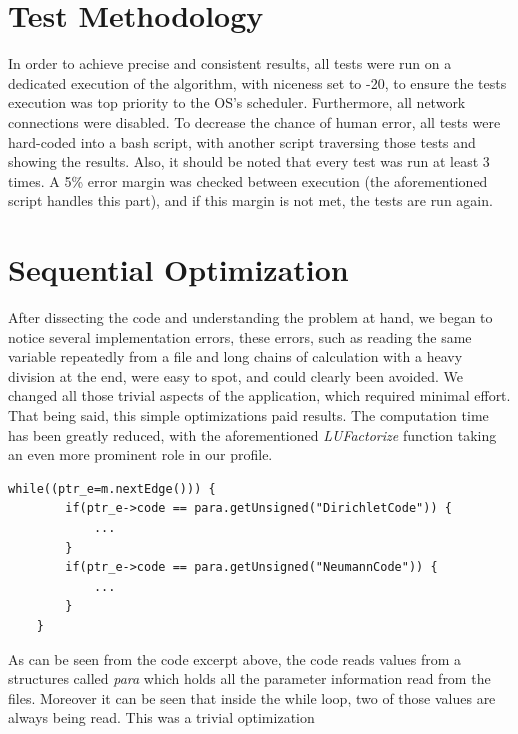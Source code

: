 \documentclass[a4paper,10pt,openright,openbib,twocolumn]{article}
\begin{document}
\section{Test Methodology} %
\label{sec:test_methodology}

In order to achieve precise and consistent results, all tests were run on a dedicated execution of the algorithm, with niceness set to -20, to ensure the tests execution was top priority to the OS's scheduler. Furthermore, all network connections were disabled. To decrease the chance of human error, all tests were hard-coded into a bash script, with another script traversing those tests and showing the results. Also, it should be noted that every test was run at least 3 times. A 5\% error margin was checked between execution (the aforementioned script handles this part), and if this margin is not met, the tests are run again. 



\section{Sequential Optimization}
\label{sec:sequentialopt}

After dissecting the code and understanding the problem at hand, we began to notice several implementation errors, these errors, such as reading the same variable repeatedly from a file and long chains of calculation with a heavy division at the end, were easy to spot, and could clearly been avoided. We changed all those trivial aspects of the application, which required minimal effort. That being said, this simple optimizations paid results. The computation time has been greatly reduced, with the aforementioned \emph{LUFactorize} function taking an even more prominent role in our profile.

\begin{minipage}{.45\textwidth}
\lstset{
    language=C++,
    basicstyle=\ttfamily\small,
    breaklines=true
}
\begin{lstlisting}[caption=Excerpt from makeFlux]
    while((ptr_e=m.nextEdge())) {
        if(ptr_e->code == para.getUnsigned("DirichletCode")) {
            ...
        }
        if(ptr_e->code == para.getUnsigned("NeumannCode")) {
            ...
        }
    }
\end{lstlisting}
\end{minipage}

As can be seen from the code excerpt above, the code reads values from a structures called \emph{para} which holds all the parameter information read from the files. Moreover it can be seen that inside the while loop, two of those values are always being read. This was a trivial optimization
\end{document}
